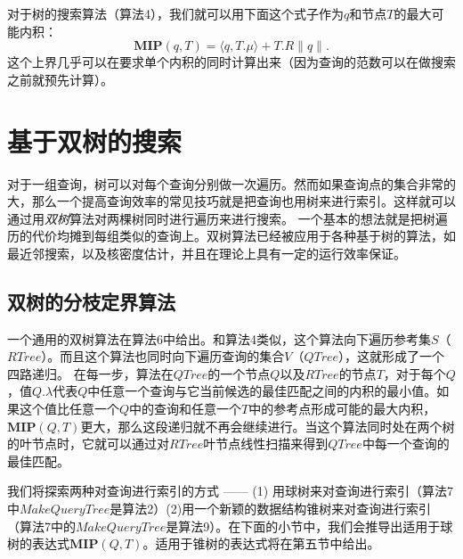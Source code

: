 \documentclass[twocolumn,a4paper]{article}
\begin{document}
对于树的搜索算法（算法4），我们就可以用下面这个式子作为$q$和节点$T$的最大可能内积：
\begin{equation*}
\mathbf{MIP}(q,T) = \langle q,T.\mu\rangle + T.R\|q\|.
\end{equation*}
这个上界几乎可以在要求单个内积的同时计算出来（因为查询的范数可以在做搜索之前就预先计算）。

\section{基于双树的搜索}
对于一组查询，树可以对每个查询分别做一次遍历。然而如果查询点的集合非常的大，那么一个提高查询效率的常见技巧就是把查询也用树来进行索引。这样就可以通过用\emph{双树}算法\cite{15}对两棵树同时进行遍历来进行搜索。
一个基本的想法就是把树遍历的代价均摊到每组类似的查询上。双树算法已经被应用于各种基于树的算法，如最近邻搜索\cite{15}，以及核密度估计\cite{16}，并且在理论上具有一定的运行效率保证\cite{31}。

\subsection{双树的分枝定界算法}
一个通用的双树算法在算法6中给出。和算法4类似，这个算法向下遍历参考集$S$（$RTree$）。而且这个算法也同时向下遍历查询的集合$V$（$QTree$），这就形成了一个四路递归。
在每一步，算法在$QTree$的一个节点$Q$以及$RTree$的节点$T$，对于每个$Q$，值$Q.\lambda$代表$Q$中任意一个查询与它当前候选的最佳匹配之间的内积的最小值。如果这个值比任意一个$Q$中的查询和任意一个$T$中的参考点形成可能的最大内积，$\mathbf{MIP}(Q,T)$更大，那么这段递归就不再会继续进行。当这个算法同时处在两个树的叶节点时，它就可以通过对$RTree$叶节点线性扫描来得到$QTree$中每一个查询的最佳匹配。

我们将探索两种对查询进行索引的方式 ------ (1) 用球树来对查询进行索引（算法7中$MakeQueryTree$是算法2）(2)用一个新颖的数据结构锥树来对查询进行索引（算法7中的$MakeQueryTree$是算法9）。在下面的小节中，我们会推导出适用于球树的表达式$\mathbf{MIP}(Q,T)$。适用于锥树的表达式将在第五节中给出。
\end{document}

